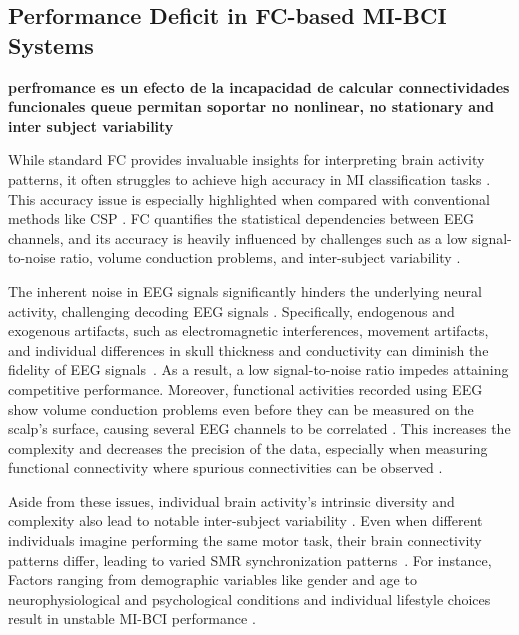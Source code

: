\subsection{Performance Deficit in FC-based MI-BCI Systems}

\textbf{perfromance es un efecto de la incapacidad de calcular connectividades funcionales queue permitan soportar no nonlinear, no stationary and inter subject variability}

While standard FC provides invaluable insights for interpreting brain activity patterns, it often struggles to achieve high accuracy in MI classification tasks \cite{chiarion2023connectivity}. This accuracy issue is especially highlighted when compared with conventional methods like CSP \cite{yang2021novel}. FC quantifies the statistical dependencies between EEG channels, and its accuracy is heavily influenced by challenges such as a low signal-to-noise ratio, volume conduction problems, and inter-subject variability \cite{abiri2019comprehensive,bastos2016tutorial}.

The inherent noise in EEG signals significantly hinders the underlying neural activity, challenging decoding EEG signals \cite{hata2016functional}. Specifically, endogenous and exogenous artifacts, such as electromagnetic interferences, movement artifacts, and individual differences in skull thickness and conductivity can diminish the fidelity of EEG signals~\cite{nentwich2020functional}. As a result, a low signal-to-noise ratio impedes attaining competitive performance. Moreover, functional activities recorded using EEG show volume conduction problems even before they can be measured on the scalp's surface, causing several EEG channels to be correlated \cite{varone2021machine}. This increases the complexity and decreases the precision of the data, especially when measuring functional connectivity where spurious connectivities can be observed \cite{bakhshayesh2019detecting}.

Aside from these issues, individual brain activity's intrinsic diversity and complexity also lead to notable inter-subject variability \cite{wriessnegger2020inter}. Even when different individuals imagine performing the same motor task, their brain connectivity patterns differ, leading to varied SMR synchronization patterns~\cite{wriessnegger2020inter, xie2020review}. For instance, Factors ranging from demographic variables like gender and age to neurophysiological and psychological conditions and individual lifestyle choices result in unstable MI-BCI performance \cite{antonakakis2020inter, huang2023discrepancy}.

